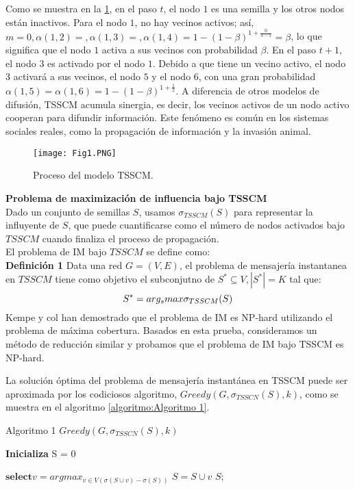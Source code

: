 \documentclass{article}
\begin{document}
Como se muestra en la \ref{Fig:01}, en el paso $t$, el nodo $1$ es una semilla y los otros nodos están inactivos. Para el nodo $1$, no hay vecinos activos; así, $m = 0, \alpha(1,2) =, \alpha(1,3) =, \alpha(1,4) = 1 - (1 - \beta)^{1+\frac{0}{3-1}} = \beta$, lo que significa que el nodo $1$ activa a sus vecinos con probabilidad $\beta$. En el paso $t + 1$, el nodo $3$ es activado por el nodo $1$. Debido a que tiene un vecino activo, el nodo 3 activará a sus vecinos, el nodo $5$ y el nodo $6$, con una gran probabilidad $\alpha(1,5) = \alpha(1,6) = 1 - (1 - \beta)^{1+\frac{1}{2}}$. A diferencia de otros modelos de difusión, TSSCM acumula sinergia, es decir, los vecinos activos de un nodo activo cooperan para difundir información. Este fenómeno es común en los sistemas sociales reales, como la propagación de información y la invasión animal.

\begin{figure}[h]
	\centering
	\texttt{[image: Fig1.PNG]}
	\label{Fig:01}
	\caption{Proceso del modelo TSSCM.}
\end{figure}

\textbf{Problema de maximización de influencia bajo TSSCM}\\

Dado un conjunto de semillas $S$, usamos $\sigma_{TSSCM}(S)$ para representar la influyente de $S$, que puede cuantificarse como el número de nodos activados bajo $TSSCM$ cuando finaliza el proceso de propagación. \\
El problema de IM bajo $TSSCM$ se define como: \\

\textbf{Definición 1} Data una red $G = (V, E)$, el problema de mensajería instantanea en $TSSCM$ tiene como objetivo el subconjutno de $S^* \subseteq V, |S^*|= K$ tal que: 
\begin{equation}
	\centering
	S^* = arg_smax\sigma_{TSSCM}(S)
\end{equation}
Kempe y col \cite{cite:12} han demostrado que el problema de IM es NP-hard utilizando el problema de máxima cobertura. Basados en esta prueba, consideramos un método de reducción similar y probamos que el problema de IM bajo TSSCM es NP-hard.

La solución óptima del problema de mensajería instantánea en TSSCM puede ser aproximada por los codiciosos algoritmo,  $Greedy(G, \sigma_{TSSCN}(S), k)$, como se muestra en el algoritmo \ref{algoritmo:Algoritmo 1}.\\

\begin{algorithm}[h]
	\label{algoritmo:Algoritmo 1}
	\caption{Algoritmo 1 $Greedy(G, \sigma_{TSSCN}(S), k)$}
	\textbf{Inicializa } S = 0\\
	\begin{algorithmic}
	 \STATE $\textbf{select} v = arg max_{v \in V(\sigma(S \cup v) - \sigma(S))}$
	 \STATE $S = S \cup v	$
	 \ENDWHILE
	 \RETURN $S$;
	\end{algorithmic}
\end{algorithm}
\end{document}
